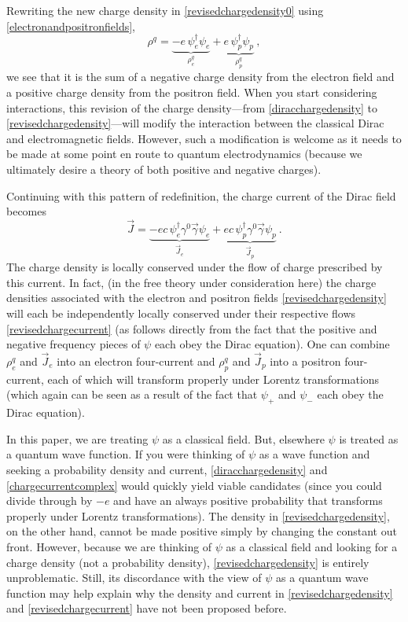 \documentclass[12pt,secnumarabic,amsmath,amssymb,balancelastpage,nofootinbib]{article}
\begin{document}
Rewriting the new charge density in \eqref{revisedchargedensity0} using \eqref{electronandpositronfields},
\begin{equation}
\rho^q=\underbrace{-e\, \psi_e^{\dagger} \psi_e}_{\mbox{$\rho^q_e$}} +\underbrace{e\, \psi_p^{\dagger} \psi_p}_{\mbox{$\rho^q_p$}}
\ ,
\label{revisedchargedensity}
\end{equation}
we see that it is the sum of a negative charge density from the electron field and a positive charge density from the positron field.  When you start considering interactions, this revision of the charge density---from \eqref{diracchargedensity} to \eqref{revisedchargedensity}---will modify the interaction between the classical Dirac and electromagnetic fields.  However, such a modification is welcome as it needs to be made at some point en route to quantum electrodynamics (because we ultimately desire a theory of both positive and negative charges).


Continuing with this pattern of redefinition, the charge current of the Dirac field becomes
\begin{equation}
\vec{J}=\underbrace{-e c\, \psi_e^{\dagger} \gamma^0 \vec{\gamma} \psi_e}_{\mbox{$\vec{J}_e$}} + \underbrace{e c\, \psi_p^{\dagger} \gamma^0 \vec{\gamma} \psi_p}_{\mbox{$\vec{J}_p$}}
\ .
\label{revisedchargecurrent}
\end{equation}
The charge density is locally conserved under the flow of charge prescribed by this current.  In fact, (in the free theory under consideration here) the charge densities associated with the electron and positron fields \eqref{revisedchargedensity} will each be independently locally conserved under their respective flows \eqref{revisedchargecurrent} (as follows directly from the fact that the positive and negative frequency pieces of $\psi$ each obey the Dirac equation).  One can combine $\rho^q_e$ and $\vec{J}_e$ into an electron four-current and $\rho^q_p$ and $\vec{J}_p$ into a positron four-current, each of which will transform properly under Lorentz transformations (which again can be seen as a result of the fact that $\psi_+$ and $\psi_-$ each obey the Dirac equation).


In this paper, we are treating $\psi$ as a classical field.  But, elsewhere $\psi$ is treated as a quantum wave function.  If you were thinking of $\psi$ as a wave function and seeking a probability density and current, \eqref{diracchargedensity} and \eqref{chargecurrentcomplex} would quickly yield viable candidates (since you could divide through by $-e$ and have an always positive probability that transforms properly under Lorentz transformations).  The density in \eqref{revisedchargedensity}, on the other hand, cannot be made positive simply by changing the constant out front.  However, because we are thinking of $\psi$ as a classical field and looking for a charge density (not a probability density), \eqref{revisedchargedensity} is entirely unproblematic.  Still, its discordance with the view of $\psi$ as a quantum wave function may help explain why the density and current in \eqref{revisedchargedensity} and \eqref{revisedchargecurrent} have not been proposed before.
\end{document}
